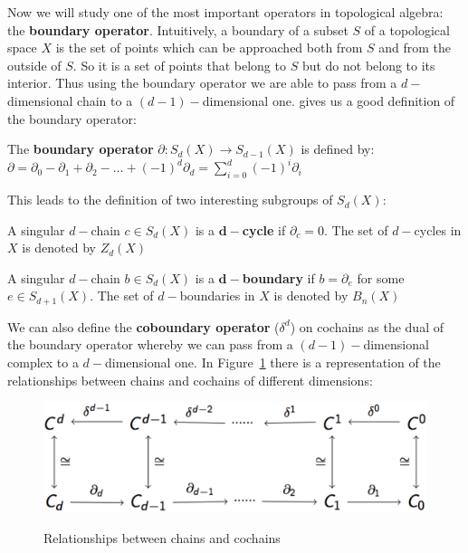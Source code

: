 Now we will study one of the most important operators in topological algebra: the \textbf{boundary operator}. Intuitively, a boundary of a subset $S$ of a topological space $X$ is the set of points which can be approached both from $S$ and from the outside of $S$. So it is a set of points that belong to $S$ but do not belong to its interior. Thus using the boundary operator we are able to pass from a $d-$dimensional chain to a $(d-1)-$dimensional one. \cite{Kosniowski} gives us a good definition of the boundary operator:

\begin{definition}
 The \textbf{boundary operator} $\partial \colon S_{d}(X) \rightarrow S_{d-1}(X)$ is defined by:\\
 $\partial = \partial_{0} - \partial_{1} + \partial_{2} - \dots + (-1)^{d}\partial_{d} = \displaystyle\sum_{i=0}^{d} (-1)^i\partial_{i}$
\end{definition}

This leads to the definition of two interesting subgroups of $S_{d}(X)$:

\begin{definition}[Cycles]
 A singular $d-$chain $c \in S_{d}(X)$ is a \textbf{$\mathbf{d-}$cycle} if $\partial_{c} = 0$. The set of $d-$cycles in $X$ is denoted by $Z_{d}(X)$
\end{definition}
 
\begin{definition}[d-boundaries]
 A singular $d-$chain $b \in S_{d}(X)$ is a \textbf{$\mathbf{d-}$boundary} if $b = \partial_{e}$ for some $e \in S_{d+1}(X)$. The set of $d-$boundaries in $X$ is denoted by $B_{n}(X)$
\end{definition}

We can also define the \textbf{coboundary operator} ($\delta^{d}$) on cochains as the dual of the boundary operator whereby we can pass from a $(d-1)-$dimensional complex to a $d-$dimensional one. In Figure~\ref{fig:larComplexMap} there is a representation of the relationships between chains and cochains of different dimensions:

\begin{figure}[htb] %
   \centering
   \includegraphics[width=0.75\linewidth]{images/chainComplexMap.png}\\
   \caption[Relationships between chains and cochains]{Relationships between chains and cochains}
   \label{fig:larComplexMap}
\end{figure}


